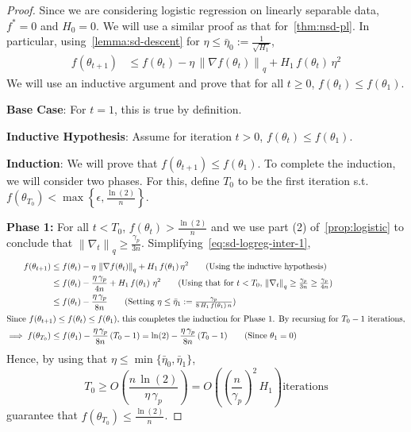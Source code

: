 \documentclass{article}
\newcommand{\norm}[1]{\left\|#1 \right\|}
\newcommand{\tht}{\theta_t}
\newcommand{\thtt}{\theta_{t+1}}
\begin{document}
\nsdlog*
\begin{proof}
Since we are considering logistic regression on linearly separable data, $f^* = 0$ and $H_0 = 0$. We will use a similar proof as that for~\cref{thm:nsd-pl}. In particular, using~\cref{lemma:sd-descent} for $\eta \leq \bar{\eta}_0 := \frac{1}{\sqrt{H_1}}$,
\begin{align}
f(\thtt) & \leq f(\tht) - \eta \, \norm{\nabla f(\tht)}_{q} +  H_1 \, f(\tht)  \, \eta^2
\label{eq:sd-logreg-inter-1}    
\end{align}
We will use an inductive argument and prove that for all $t \geq 0$, $f(\tht) \leq f(\theta_1)$. 

\textbf{Base Case}: For $t = 1$, this is true by definition. 

\textbf{Inductive Hypothesis}: Assume for iteration $t > 0$, $f(\tht) \leq f(\theta_1)$.

\textbf{Induction}: We will prove that $f(\thtt) \leq f(\theta_1)$. To complete the induction, we will consider two phases. For this, define $T_0$ to be the first iteration s.t. $f(\theta_{T_0}) < \max\left\{\epsilon, \frac{\ln(2)}{n}\right\}$. 

\textbf{Phase 1:} For all $t < T_0$, $f(\tht) > \frac{\ln(2)}{n}$ and we use part (2) of~\cref{prop:logistic} to conclude that $\norm{\nabla_t}_q \geq \frac{\gamma_p}{3n}$. Simplifying~\cref{eq:sd-logreg-inter-1},
\begin{align*}
f(\thtt) & \leq f(\tht) - \eta \, \norm{\nabla f(\tht)}_{q} +  H_1 \, f(\theta_1)  \, \eta^2 \tag{Using the inductive hypothesis} \\
& \leq f(\tht) - \frac{\eta \, \gamma_p}{4n} + H_1 \, f(\theta_1) \, \, \eta^2 \tag{Using that for $t < T_0$, $\norm{\nabla_t}_q \geq \frac{\gamma_p}{3n} \geq \frac{\gamma_p}{4n} $} \\
& \leq f(\tht) - \frac{\eta \, \gamma_p}{8n} \tag{Setting $\eta \leq \bar{\eta}_1 := \frac{\gamma_p}{8 \, H_1 \, f(\theta_1) \, n}$} \\
\intertext{Since $f(\thtt) \leq f(\tht) \leq f(\theta_1)$, this completes the induction for Phase 1. By recursing for $T_0-1$ iterations,}
\implies f(\theta_{T_0}) & \leq f(\theta_1) -  \frac{\eta \, \gamma_p}{8n} \, (T_0-1) = \ln(2) -  \frac{\eta \, \gamma_p}{8n} \, (T_0-1) \tag{Since $\theta_1 = 0$}
\end{align*}
Hence, by using that $\eta \leq \min\{\bar{\eta}_0, \bar{\eta}_1\}$,
\[
T_0 \geq O \left(\frac{n \, \ln(2)}{\eta \, \gamma_p} \right) = O \left( \left(\frac{n}{\gamma_p}\right)^2 \, H_1 \right) \text{iterations}
\]
guarantee that $f(\theta_{T_0}) \leq \frac{\ln(2)}{n}$. 


\end{proof}
\end{document}
